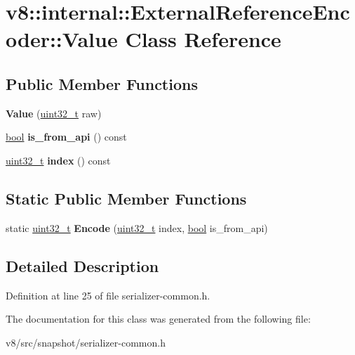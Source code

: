 \hypertarget{classv8_1_1internal_1_1ExternalReferenceEncoder_1_1Value}{}\section{v8\+:\+:internal\+:\+:External\+Reference\+Encoder\+:\+:Value Class Reference}
\label{classv8_1_1internal_1_1ExternalReferenceEncoder_1_1Value}
\subsection*{Public Member Functions}
\begin{DoxyCompactItemize}
\item 
\mbox{\label{classv8_1_1internal_1_1ExternalReferenceEncoder_1_1Value_a45a56c67501f78219ab44ef81136ffe4}} 
{\bfseries Value} (\mbox{\hyperlink{classuint32__t}{uint32\+\_\+t}} raw)
\item 
\mbox{\label{classv8_1_1internal_1_1ExternalReferenceEncoder_1_1Value_a26cff1d3758cb434c65c72cfdb31adba}} 
\mbox{\hyperlink{classbool}{bool}} {\bfseries is\+\_\+from\+\_\+api} () const
\item 
\mbox{\label{classv8_1_1internal_1_1ExternalReferenceEncoder_1_1Value_ae55cd128360e9bb4dae468d13e3268b1}} 
\mbox{\hyperlink{classuint32__t}{uint32\+\_\+t}} {\bfseries index} () const
\end{DoxyCompactItemize}
\subsection*{Static Public Member Functions}
\begin{DoxyCompactItemize}
\item 
\mbox{\label{classv8_1_1internal_1_1ExternalReferenceEncoder_1_1Value_aa861a1774dea6f2c8391dfa04c28da5b}} 
static \mbox{\hyperlink{classuint32__t}{uint32\+\_\+t}} {\bfseries Encode} (\mbox{\hyperlink{classuint32__t}{uint32\+\_\+t}} index, \mbox{\hyperlink{classbool}{bool}} is\+\_\+from\+\_\+api)
\end{DoxyCompactItemize}


\subsection{Detailed Description}


Definition at line 25 of file serializer-\/common.\+h.



The documentation for this class was generated from the following file\+:\begin{DoxyCompactItemize}
\item 
v8/src/snapshot/serializer-\/common.\+h\end{DoxyCompactItemize}
